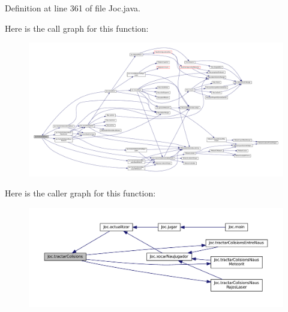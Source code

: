Definition at line 361 of file Joc.\+java.



Here is the call graph for this function\+:
\nopagebreak
\begin{figure}[H]
\begin{center}
\leavevmode
\includegraphics[width=350pt]{class_joc_a1be330c10f1e2ee06f696e0a0bdec7c7_cgraph}
\end{center}
\end{figure}




Here is the caller graph for this function\+:
\nopagebreak
\begin{figure}[H]
\begin{center}
\leavevmode
\includegraphics[width=350pt]{class_joc_a1be330c10f1e2ee06f696e0a0bdec7c7_icgraph}
\end{center}
\end{figure}


\hypertarget{class_joc_a16b0be1ee6298106946df8150044f667}{}
